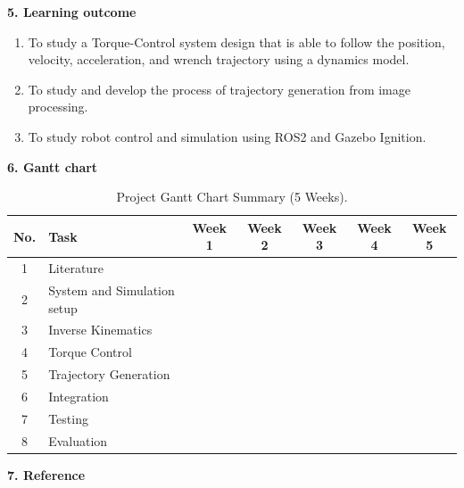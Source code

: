 \documentclass[10pt]{article}
\begin{document}
\newpage

\large
\noindent
\textbf{5. Learning outcome} \\
\normalsize
\vspace*{-0.9\baselineskip} 
\begin{enumerate}[nosep, itemsep=-2pt]
    \item To study a Torque-Control system design that is able to follow the position, velocity, acceleration, and wrench trajectory using a dynamics model. 
    \item To study and develop the process of trajectory generation from image processing.
    \item To study robot control and simulation using ROS2 and Gazebo Ignition.
\end{enumerate}

\large
\noindent
\textbf{6. Gantt chart} \\
\normalsize
\renewcommand{\figurename}{Table} %
\begin{table}[h]
\centering
\begin{tabular}{|c|l|c|c|c|c|c|}
\hline
\textbf{No.} & \textbf{Task} & \textbf{Week 1} & \textbf{Week 2} & \textbf{Week 3} & \textbf{Week 4} & \textbf{Week 5} \\ \hline
1 & Literature & \cellcolor{ganttbar} &  &  &  &  \\ \hline
2 & System and Simulation setup & \cellcolor{ganttbar} &  &  &  &  \\ \hline
3 & Inverse Kinematics &  & \cellcolor{ganttbar} &  &  &  \\ \hline
4 & Torque Control &  & \cellcolor{ganttbar} & \cellcolor{ganttbar}  &  &  \\ \hline
5 & Trajectory Generation &  & \cellcolor{ganttbar} & \cellcolor{ganttbar}  &  &  \\ \hline
6 & Integration &  &  & \cellcolor{ganttbar} &  &  \\ \hline
7 & Testing &  &  &  & \cellcolor{ganttbar} &  \\ \hline
8 & Evaluation &  &  &  &  & \cellcolor{ganttbar} \\ \hline
\end{tabular}
\caption{Project Gantt Chart Summary (5 Weeks).}
\label{tab:gantt_excel}
\end{table}


\large
\noindent
\textbf{7. Reference} \\
\normalsize 
\end{document}
